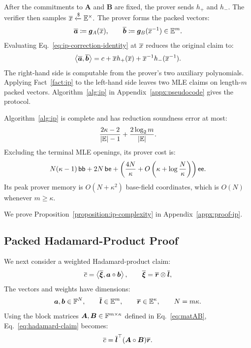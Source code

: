 After the commitments to \(\bm A\) and \(\bm B\) are fixed, the
prover sends \(h_+\) and \(h_-\). The verifier then samples
\(
    \overline{x}\mathrel{\xleftarrow{\$}}\mathbb{E}^\times.
\)
The prover forms the packed vectors:
\[
    \overline{\bm a}
    \coloneqq
    \bm g_A(\overline{x}),
    \qquad
    \overline{\bm b}
    \coloneqq
    \bm g_B(\overline{x}^{-1})
    \in\mathbb{E}^m.
\]
Evaluating Eq.~\eqref{eq:ip-correction-identity} at \(\overline{x}\)
reduces the original claim to:
\begin{equation}
    \left\langle
        \overline{\bm a},\overline{\bm b}
    \right\rangle
    =
    c
    +\overline{x}h_+(\overline{x})
    +\overline{x}^{-1}h_-(\overline{x}^{-1}).
\label{eq:packed-inner-product-check}
\end{equation}
The right-hand side is computable from the prover's two auxiliary
polynomials. Applying Fact~\ref{fact:ip} to the left-hand side
leaves two MLE claims on length-\(m\) packed vectors.
Algorithm~\ref{alg:ip} in Appendix~\ref{appx:pseudocode} gives
the protocol.

\begin{proposition}
\label{proposition:ip-complexity}
Algorithm~\ref{alg:ip} is complete and has reduction soundness
error at most:
\[
    \frac{2\kappa-2 }{|\mathbb{E}|-1} + \frac{2\log_2 m}{|\mathbb{E}|}.
\]
Excluding the terminal MLE openings, its prover cost is:
\[
    N(\kappa-1)\,\mathsf{bb}
    +
    2N\,\mathsf{be}
    +
    \left(
        \frac{4N}{\kappa}
        +
        O\left(
            \kappa+\log\frac{N}{\kappa}
        \right)
    \right)\mathsf{ee}.
\]
Its peak prover memory is \(O(N+\kappa^2)\) base-field
coordinates, which is \(O(N)\) whenever \(m\geq\kappa\).
\end{proposition}

We prove Proposition~\ref{proposition:ip-complexity} in
Appendix~\ref{appx:proof-ip}.

\subsection{Packed Hadamard-Product Proof}
\label{sec:hadamard}

We next consider a weighted Hadamard-product claim:
\begin{equation}
    \overline{c}
    =
    \left\langle
        \overline{\bm\xi},
        \bm a\circ\bm b
    \right\rangle,
    \qquad
    \overline{\bm\xi}
    =
    \overline{\bm r}\mathbin{\otimes}\overline{\bm l},
\label{eq:hadamard-claim}
\end{equation}
The vectors and weights have dimensions:
\[
    \bm a,\bm b\in{\mathbb{F}}^N,
    \qquad
    \overline{\bm l}\in\mathbb{E}^m,
    \qquad
    \overline{\bm r}\in\mathbb{E}^\kappa,
    \qquad
    N=m\kappa.
\]
Using the block matrices \(\bm A,\bm B\in{\mathbb{F}}^{m\times\kappa}\)
defined in Eq.~\eqref{eq:matAB}, Eq.~\eqref{eq:hadamard-claim}
becomes:
\begin{equation*}
    \overline{c}
    =
    \overline{\bm l}^{\top}
    (\bm A\circ\bm B)
    \overline{\bm r}.
\end{equation*}

